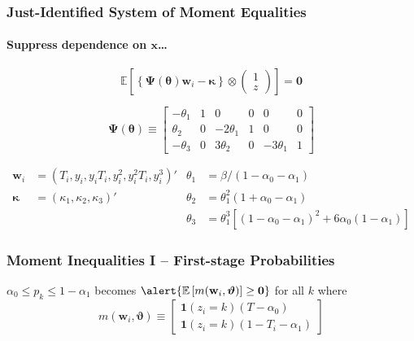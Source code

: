 \documentclass[handout]{beamer}
\begin{document}
\begin{frame}[label=MEQS_APPEND]
  \frametitle{Just-Identified System of Moment Equalities}
  \framesubtitle{Suppress dependence on $\mathbf{x}$\dots} 

  \small
\[
\mathbb{E}\left[
  \left\{\boldsymbol{\Psi}(\boldsymbol{\theta})\mathbf{w}_i - \boldsymbol{\kappa}\right\} \otimes 
\left(
\begin{array}{c}
  1 \\ z
\end{array}\right)
\right] = \mathbf{0}
\]

  \footnotesize
\[
  \boldsymbol{\Psi}(\boldsymbol{\theta}) \equiv
 \left[
  \begin{array}{rrrrrr}
    -\theta_1 & 1 & 0 & 0 & 0 & 0\\
    \theta_2 & 0 & -2\theta_1 & 1 & 0 & 0\\ 
    -\theta_3 & 0 & 3\theta_2 & 0 & -3\theta_1 & 1
\end{array}\right]
\]

  \begin{align*}
\mathbf{w}_i &= (T_i, y_i, y_iT_i, y_i^2, y_i^2 T_i, y_i^3)' &
  \theta_1 &= \beta/(1 - \alpha_0 - \alpha_1) \\
\boldsymbol{\kappa} &= (\kappa_1, \kappa_2, \kappa_3)'  &
  \theta_2 &= \theta_1^2 (1 + \alpha_0 - \alpha_1)\\
  & & \theta_3 &= \theta_1^3\left[ (1 - \alpha_0 - \alpha_1)^2 + 6\alpha_0(1 - \alpha_1) \right] 
\end{align*}

    \hyperlink{INEQ_BODY}{}
\end{frame}
\begin{frame}[label=INEQ_APPEND]
  \frametitle{Moment Inequalities I -- First-stage Probabilities}

  $\alpha_0 \leq p_k \leq 1 - \alpha_1$ becomes $\alert{\mathbb{E}\left[ m(\mathbf{w}_i,\boldsymbol{\vartheta} ) \right] \geq \mathbf{0}}$ for all $k$ where
\[
  m(\mathbf{w}_i, \boldsymbol{\vartheta}) \equiv \left[
  \begin{array}{l}
    \mathbf{1}(z_i=k)(T - \alpha_0) \\
    \mathbf{1}(z_i = k) (1 - T_i - \alpha_1) 
  \end{array}
\right]
\]
  
\end{frame}
\end{document}
